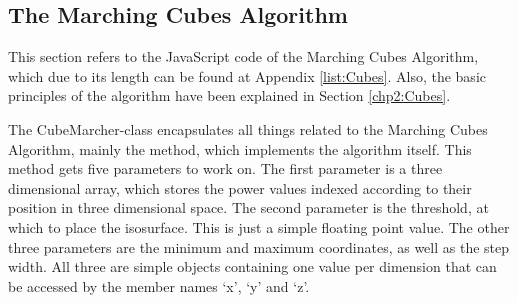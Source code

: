 \subsection{The Marching Cubes Algorithm}
This section refers to the JavaScript code of the Marching Cubes Algorithm, which due to its length can be found at Appendix \ref{list:Cubes}. Also, the basic principles of the algorithm have been explained in Section \ref{chp2:Cubes}.

The CubeMarcher-class encapsulates all things related to the Marching Cubes Algorithm, mainly the method, which implements the algorithm itself. This method gets five parameters to work on. The first parameter is a three dimensional array, which stores the power values indexed according to their position in three dimensional space. The second parameter is the threshold, at which to place the isosurface. This is just a simple floating point value. The other three parameters are the minimum and maximum coordinates, as well as the step width. All three are simple objects containing one value per dimension that can be accessed by the member names `x', `y' and `z'.

